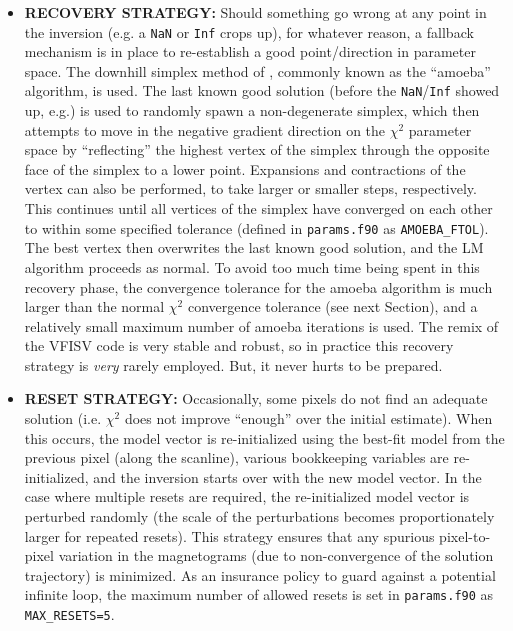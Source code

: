 \documentclass[11pt]{article}
\begin{document}
\begin{itemize}
  \renewcommand\labelitemi{\scriptsize$\blacksquare$}
  \item \textbf{RECOVERY STRATEGY:} Should something go wrong at any point in the inversion (e.g. a
        \texttt{NaN} or \texttt{Inf} crops up), for whatever reason, a fallback mechanism is in place to re-establish a
        good point/direction in parameter space.  The downhill simplex method of \citet{nelder:1965},
        commonly known as the ``amoeba'' algorithm, is used.  The last known good solution (before the
        \texttt{NaN}/\texttt{Inf} showed up, e.g.) is used to randomly spawn a non-degenerate simplex, which
        then attempts to move in the negative gradient direction on the $\chi^{2}$ parameter space by ``reflecting''
        the highest vertex of the simplex through the opposite face of the simplex to a lower point.  Expansions and
        contractions of the vertex can also be performed, to take larger or smaller steps, respectively.  This continues
        until all vertices of the simplex have converged on each other to within some specified tolerance
        (defined in \texttt{params.f90} as \texttt{AMOEBA\_FTOL}).  The best vertex then overwrites the
        last known good solution, and the LM algorithm proceeds as normal.  To avoid too much time being spent
        in this recovery phase, the convergence tolerance for the amoeba algorithm is much larger than the normal $\chi^{2}$ convergence
        tolerance (see next Section), and a relatively small maximum number of amoeba iterations is used.
        The \solisvsm remix of the VFISV code is very stable and robust, so in practice this recovery strategy
        is \textit{very} rarely employed.  But, it never hurts to be prepared.
  \item \textbf{RESET STRATEGY:} Occasionally, some pixels do not find an adequate solution (i.e. $\chi^{2}$ does not
        improve ``enough'' over the initial estimate).  When this occurs, the model vector is re-initialized
        using the best-fit model from the previous pixel (along the scanline), various bookkeeping variables
        are re-initialized, and the inversion starts over with the new model vector.  In the case where multiple
        resets are required, the re-initialized model vector is perturbed randomly (the scale of the perturbations
        becomes proportionately larger for repeated resets).  This strategy ensures that any spurious pixel-to-pixel
        variation in the magnetograms (due to non-convergence of the solution trajectory) is minimized.  As an insurance
        policy to guard against a potential infinite loop, the maximum number of allowed resets is set in
        \texttt{params.f90} as \texttt{MAX\_RESETS=5}.
\end{itemize}
\end{document}
